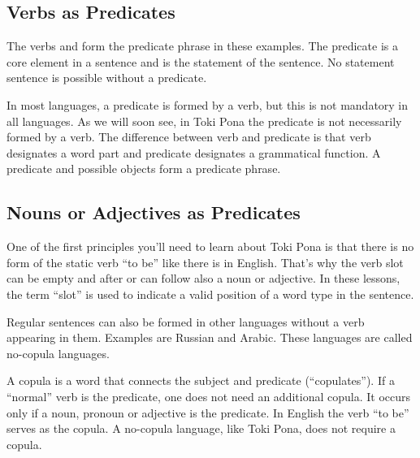 \subsection*{Verbs as Predicates}

The verbs  and  form the predicate phrase in these examples.
The predicate is a core element in a sentence and is the statement of the sentence.
No statement sentence is possible without a predicate.

In most languages, a predicate is formed by a verb, but this is not mandatory in all languages.
As we will soon see, in Toki Pona the predicate is not necessarily formed by a verb.
The difference between verb and predicate is that verb designates a word part and predicate designates a grammatical function.
A predicate and possible objects form a predicate phrase.

\subsection*{Nouns or Adjectives as Predicates}

One of the first principles you'll need to learn about Toki Pona is that there is no form of the static verb ``to be'' like there is in English.
That's why the verb slot can be empty and after  or  can follow also a noun or adjective.
In these lessons, the term ``slot'' is used to indicate a valid position of a word type in the sentence.

Regular sentences can also be formed in other languages without a verb appearing in them.
Examples are Russian and Arabic.
These languages are called no-copula languages.

A copula is a word that connects the subject and predicate (``copulates'').
If a ``normal'' verb is the predicate, one does not need an additional copula.
It occurs only if a noun, pronoun or adjective is the predicate.
In English the verb ``to be'' serves as the copula.
A no-copula language, like Toki Pona, does not require a copula.

